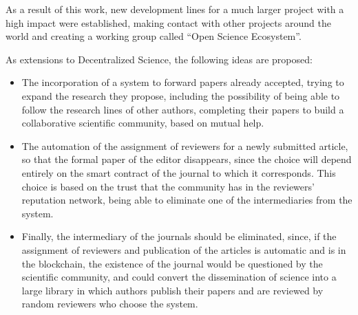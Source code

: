 As a result of this work, new development lines for a much larger project with a high impact were established, making contact with other projects around the world and creating a working group called ``Open Science Ecosystem''.

As extensions to Decentralized Science, the following ideas are proposed:

\begin{itemize}
  \item The incorporation of a system to forward papers already accepted, trying to expand the research they propose, including the possibility of being able to follow the research lines of other authors, completing their papers to build a collaborative scientific community, based on mutual help.
  \item The automation of the assignment of reviewers for a newly submitted article, so that the formal paper of the editor disappears, since the choice will depend entirely on the smart contract of the journal to which it corresponds. This choice is based on the trust that the community has in the reviewers' reputation network, being able to eliminate one of the intermediaries from the system.
  \item Finally, the intermediary of the journals should be eliminated, since, if the assignment of reviewers and publication of the articles is automatic and is in the blockchain, the existence of the journal would be questioned by the scientific community, and could convert the dissemination of science into a large library in which authors publish their papers and are reviewed by random reviewers who choose the system.
\end{itemize}



